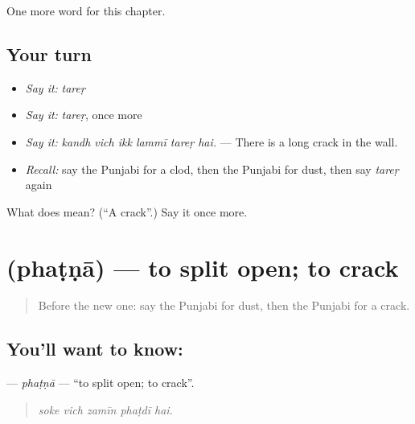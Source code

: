 \begin{grammarlens}[title={What you've built}]
One more word for this chapter.
\end{grammarlens}

\subsection*{Your turn}
\begin{itemize}
\raggedright
  \item \emph{Say it:} \emph{tareṛ}
  \item \emph{Say it:} \emph{tareṛ}, once more
  \item \emph{Say it:} \emph{kandh vich ikk lammī tareṛ hai.} — There is a long crack in the wall.
  \item \emph{Recall:} say the Punjabi for a clod, then the Punjabi for dust, then say \emph{tareṛ} again
\end{itemize}

\begin{tcolorbox}[breakable,colback=teal!4,colframe=teal!35!black,title={Before you move on}]
What does  mean? (\textquotedblleft{}A crack\textquotedblright{}.) Say it once more.
\end{tcolorbox}
\section[\texorpdfstring{\pa{ਫਟਣਾ} (phaṭṇā)}{ਫਟਣਾ (phaṭṇā)}]{ (phaṭṇā) — to split open; to crack}

\label{lesson:PA-C295-phatna}



\begin{quote}
Before the new one: say the Punjabi for dust, then the Punjabi for a crack.
\end{quote}

\subsection*{You'll want to know: }
\textbf{} — \emph{phaṭṇā} — \textquotedblleft{}to split open; to crack\textquotedblright{}.

\begin{quote}
    
\end{quote}

\begin{quote}
\emph{soke vich zamīn phaṭdī hai.}
\end{quote}

